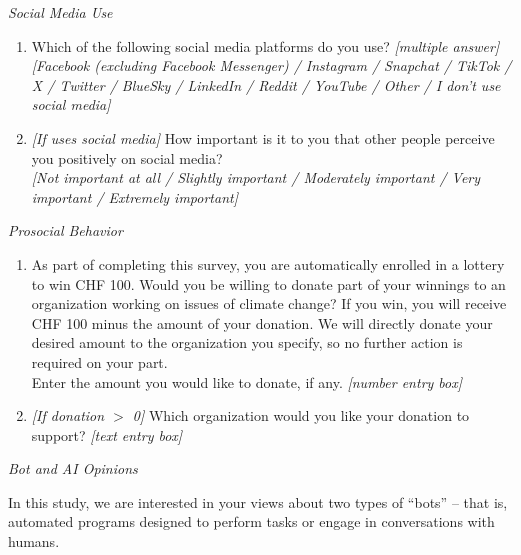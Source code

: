 \documentclass[12pt,notitlepage]{article}
\theoremstyle{plain}
\theoremstyle{plain}
\theoremstyle{definition}
\theoremstyle{definition}
\theoremstyle{assumption}
\theoremstyle{plain}
\theoremstyle{plain}
\theoremstyle{plain}
\theoremstyle{plain}
\theoremstyle{definition}%
\theoremstyle{plain}
\theoremstyle{plain}
\theoremstyle{plain}
\theoremstyle{plain}
\begin{document}
\vspace{12pt}
\emph{Social Media Use}

\begin{enumerate}
\item Which of the following social media platforms do you use? \emph{[multiple answer]}\\
\emph{[Facebook (excluding Facebook Messenger) / Instagram / Snapchat / TikTok / X / Twitter / BlueSky / LinkedIn / Reddit / YouTube / Other / I don't use social media]}
\item \emph{[If uses social media]} How important is it to you that other people perceive you positively on social media?\\
\emph{[Not important at all / Slightly important / Moderately important / Very important / Extremely important]}
\end{enumerate}

\vspace{12pt}
\emph{Prosocial Behavior}

\begin{enumerate}
\item As part of completing this survey, you are automatically enrolled in a lottery to win CHF 100. Would you be willing to donate part of your winnings to an organization working on issues of climate change? If you win, you will receive CHF 100 minus the amount of your donation. We will directly donate your desired amount to the organization you specify, so no further action is required on your part.\\
Enter the amount you would like to donate, if any. \emph{[number entry box]}
\item \emph{[If donation $>$ 0]} Which organization would you like your donation to support? \emph{[text entry box]}
\end{enumerate}

\vspace{12pt}
\emph{Bot and AI Opinions}

In this study, we are interested in your views about two types of ``bots'' -- that is, automated programs designed to perform tasks or engage in conversations with humans.
\end{document}
